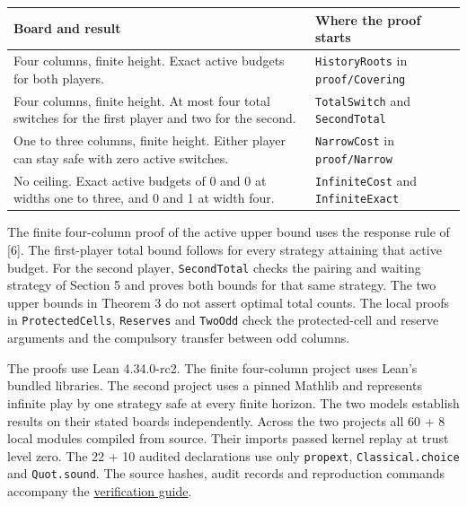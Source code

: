 \documentclass[
  a4paper,
]{article}
\newcounter{none} %
\begin{document}
{\def\LTcaptype{none} %
\begin{longtable}[]{@{}
  >{\raggedright\arraybackslash}p{}
  >{\raggedright\arraybackslash}p{}@{}}
\toprule\noalign{}
\begin{minipage}[b]{\linewidth}\raggedright
Board and result
\end{minipage} & \begin{minipage}[b]{\linewidth}\raggedright
Where the proof starts
\end{minipage} \\
\midrule\noalign{}
\endhead
\bottomrule\noalign{}
\endlastfoot
Four columns, finite height. Exact active budgets for both players. &
\texttt{HistoryRoots} in \texttt{proof/Covering} \\
Four columns, finite height. At most four total switches for the first
player and two for the second. & \texttt{TotalSwitch} and
\texttt{SecondTotal} \\
One to three columns, finite height. Either player can stay safe with
zero active switches. & \texttt{NarrowCost} in \texttt{proof/Narrow} \\
No ceiling. Exact active budgets of 0 and 0 at widths one to three, and
0 and 1 at width four. & \texttt{InfiniteCost} and
\texttt{InfiniteExact} \\
\end{longtable}
}

The finite four-column proof of the active upper bound uses the response
rule of {[}6{]}. The first-player total bound follows for every strategy
attaining that active budget. For the second player,
\texttt{SecondTotal} checks the pairing and waiting strategy of Section
5 and proves both bounds for that same strategy. The two upper bounds in
Theorem 3 do not assert optimal total counts. The local proofs in
\texttt{ProtectedCells}, \texttt{Reserves} and \texttt{TwoOdd} check the
protected-cell and reserve arguments and the compulsory transfer between
odd columns.

The proofs use Lean 4.34.0-rc2. The finite four-column project uses
Lean's bundled libraries. The second project uses a pinned Mathlib and
represents infinite play by one strategy safe at every finite horizon.
The two models establish results on their stated boards independently.
Across the two projects all 60 + 8 local modules compiled from source.
Their imports passed kernel replay at trust level zero. The 22 + 10
audited declarations use only \texttt{propext},
\texttt{Classical.choice} and \texttt{Quot.sound}. The source hashes,
audit records and reproduction commands accompany the
\href{https://github.com/wugang6812/narrow-connect-four/blob/main/docs/verification.md}{verification
guide}.
\end{document}
